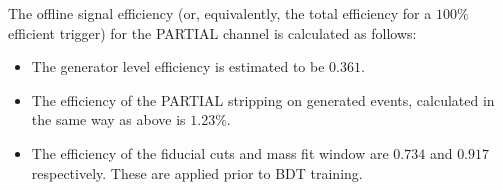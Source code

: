 The offline signal efficiency (or, equivalently, the total efficiency for a $100\%$ efficient trigger) for the PARTIAL channel is calculated as follows:
\begin{itemize}

\item The generator level efficiency is estimated to be $0.361$. 
\item The efficiency of the PARTIAL stripping on generated events, calculated in the same way as above is $1.23\%$.
\item The efficiency of the fiducial cuts  and mass fit window are $0.734$ and $0.917$ respectively. These are applied prior to BDT training.
\end{itemize}
